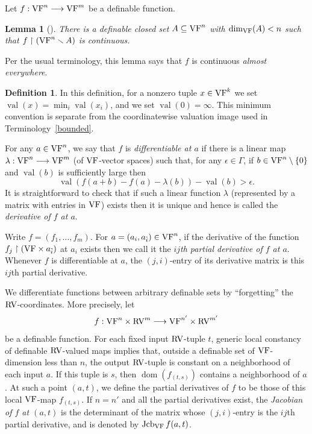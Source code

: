 \documentclass[12pt]{amsart}
\newcommand{\memph}[1]{{\color{magenta}\emph{#1}}}
\theoremstyle{plain}
\newtheorem{lem}[thm]{Lemma}
\theoremstyle{definition}
\newtheorem{defn}[thm]{Definition}
\theoremstyle{remark}
\numberwithin{equation}{section}
\theoremstyle{plain}
\newcommand{\VF}{\textup{VF}}
\newcommand{\RV}{\textup{RV}}
\DeclareMathOperator{\dom}{dom}
\DeclareMathOperator{\jcb}{Jcb}
\newcommand{\0}{\emptyset}
\newcommand{\rest}{\upharpoonright}
\newcommand{\fun}{\longrightarrow}
\newcommand{\sub}{\subseteq}
\newcommand{\mi}{\smallsetminus}
\DeclareMathOperator{\vv}{val}
\begin{document}
Let $f : \VF^n \fun \VF^m$ be a definable function.

\begin{lem}[{\cite[Lemma~8.7]{Yin:special:trans}}]\label{fun:almost:cont}
There is a definable closed set $A \sub \VF^n$ with $\dim_{\VF}(A) < n$ such that $f \rest (\VF^n \mi A)$ is continuous.
\end{lem}

Per the usual terminology, this lemma says that $f$ is continuous \memph{almost everywhere}.

\begin{defn}\label{defn:diff}
In this definition, for a nonzero tuple $x\in\VF^k$ we set $\vv(x)=\min_i\vv(x_i)$, and we set $\vv(0)=\infty$. This minimum convention is separate from the coordinatewise valuation image used in Terminology~\ref{bounded}.


For any $a \in \VF^n$, we say that $f$ is \memph{differentiable at $a$} if there is a linear map $\lambda : \VF^n \fun \VF^m$ (of $\VF$-vector spaces) such that, for any $\epsilon \in \Gamma$, if $b \in \VF^n\setminus\{0\}$ and $\vv(b)$ is sufficiently large then
\[
\vv(f(a + b) - f(a) - \lambda(b)) - \vv(b) > \epsilon.
\]
It is straightforward to check that if such a linear function $\lambda$ (represented by a matrix with entries in $\VF$) exists then it is unique and hence is called the \memph{derivative of $f$ at $a$}.

Write $f = (f_1, \ldots, f_m)$. For $a = (a_i, a_{\tilde i}) \in \VF^n$, if the derivative of the function $f_j \rest (\VF \times a_{\tilde i})$ at $a_i$ exists then we call it the \memph{$ij$th partial derivative of $f$ at $a$}. Whenever $f$ is differentiable at $a$, the $(j,i)$-entry of its derivative matrix is this $ij$th partial derivative.
\end{defn}


We differentiate functions between arbitrary definable sets by ``forgetting'' the $\RV$-coordinates. More precisely, let
\[
f : \VF^n \times \RV^m \fun \VF^{n'} \times \RV^{m'}
\]
be a definable function. For each fixed input $\RV$-tuple $t$, generic local constancy of definable $\RV$-valued maps \cite[Lemma~8.9]{Yin:special:trans} implies that, outside a definable set of $\VF$-dimension less than $n$, the output $\RV$-tuple is constant on a neighborhood of each input $a$. If this tuple is $s$, then $\dom(f_{(t,s)})$ contains a neighborhood of $a$. At such a point $(a,t)$, we define the partial derivatives of $f$ to be those of this local $\VF$-map $f_{(t,s)}$. If $n = n'$ and all the partial derivatives exist, the \memph{Jacobian of $f$ at $(a,t)$} is the determinant of the matrix whose $(j,i)$-entry is the $ij$th partial derivative, and is denoted by $\jcb_{\VF} f(a,t)$.
\end{document}
